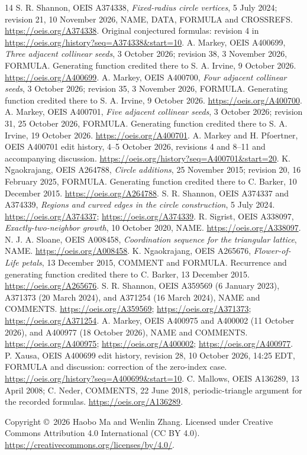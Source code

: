 \documentclass[11pt]{article}
\begin{document}
\begin{thebibliography}{14}
 S. R. Shannon, OEIS A374338, \emph{Fixed-radius circle vertices},
5 July 2024; revision 21, 10 November 2026, NAME, DATA, FORMULA and CROSSREFS.
\url{https://oeis.org/A374338}.
Original conjectured formulas: revision 4 in
\url{https://oeis.org/history?seq=A374338\&start=10}.
 A. Markey, OEIS A400699, \emph{Three adjacent collinear seeds},
3 October 2026; revision 38, 3 November 2026, FORMULA.
Generating function credited there to S. A. Irvine, 9 October 2026.
\url{https://oeis.org/A400699}.
 A. Markey, OEIS A400700, \emph{Four adjacent collinear seeds},
3 October 2026; revision 35, 3 November 2026, FORMULA.
Generating function credited there to S. A. Irvine, 9 October 2026.
\url{https://oeis.org/A400700}.
 A. Markey, OEIS A400701, \emph{Five adjacent collinear seeds},
3 October 2026; revision 31, 25 October 2026, FORMULA.
Generating function credited there to S. A. Irvine, 19 October 2026.
\url{https://oeis.org/A400701}.
 A. Markey and H. Pfoertner, OEIS A400701 edit history,
4--5 October 2026, revisions 4 and 8--11 and accompanying discussion.
\url{https://oeis.org/history?seq=A400701\&start=20}.
 K. Ngaokrajang, OEIS A264788, \emph{Circle additions},
25 November 2015; revision 20, 16 February 2025, FORMULA.
Generating function credited there to C. Barker, 10 December 2015.
\url{https://oeis.org/A264788}.
 S. R. Shannon, OEIS A374337 and A374339,
\emph{Regions and curved edges in the circle construction}, 5 July 2024.
\url{https://oeis.org/A374337}; \url{https://oeis.org/A374339}.
 R. Sigrist, OEIS A338097, \emph{Exactly-two-neighbor growth},
10 October 2020, NAME. \url{https://oeis.org/A338097}.
 N. J. A. Sloane, OEIS A008458, \emph{Coordination sequence for
the triangular lattice}, NAME. \url{https://oeis.org/A008458}.
 K. Ngaokrajang, OEIS A265676, \emph{Flower-of-Life petals},
13 December 2015, COMMENT and FORMULA. Recurrence and generating function
credited there to C. Barker, 13 December 2015. \url{https://oeis.org/A265676}.
 S. R. Shannon, OEIS A359569 (6 January 2023),
A371373 (20 March 2024), and A371254 (16 March 2024), NAME and COMMENTS.
\url{https://oeis.org/A359569}; \url{https://oeis.org/A371373};
\url{https://oeis.org/A371254}.
 A. Markey, OEIS A400975 and A400002 (11 October 2026),
and A400977 (18 October 2026), NAME and COMMENTS.
\url{https://oeis.org/A400975}; \url{https://oeis.org/A400002};
\url{https://oeis.org/A400977}.
 P. Xausa, OEIS A400699 edit history, revision 28,
10 October 2026, 14:25 EDT, FORMULA and discussion: correction of the
zero-index case. \url{https://oeis.org/history?seq=A400699\&start=10}.
 C. Mallows, OEIS A136289, 13 April 2008; C. Neder,
COMMENTS, 22 June 2018, periodic-triangle argument for the recorded formulas.
\url{https://oeis.org/A136289}.
\end{thebibliography}
\noindent\small Copyright \copyright\ 2026 Haobo Ma and Wenlin Zhang.
Licensed under Creative Commons Attribution 4.0 International (CC BY 4.0).
\url{https://creativecommons.org/licenses/by/4.0/}.
\end{document}
